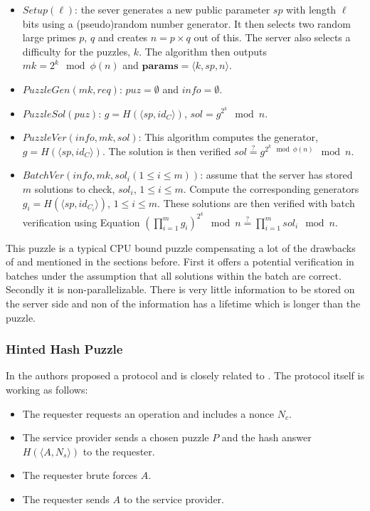 \begin{itemize}
	\item $Setup(\ell)$: the sever generates a new public parameter $sp$ with length $\ell$ bits using a (pseudo)random number generator. It then selects two random large primes $p$, $q$ and creates $n = p \times q$ out of this. The server also selects a difficulty for the puzzles, $k$. The algorithm then outputs $mk = 2^k  \mod \phi(n)$ and $\mathbf{params} = \langle k, sp, n \rangle$.
	\item $PuzzleGen(mk, req)$: $puz = \emptyset$ and $info = \emptyset$.	
	\item $PuzzleSol(puz)$: $g = H( \langle sp, id_C \rangle )$, $sol = g^{2^k} \mod n$.
	\item $PuzzleVer(info, mk, sol)$: This algorithm computes the generator, $g = H( \langle sp, id_C \rangle )$. The solution is then verified $sol \stackrel{?}{=} g^{2^k \mod \phi(n)} \mod n$.
	\item $BatchVer(info, mk, sol_i (1 \leq i \leq m))$: assume that the server has stored $m$ solutions to check, $sol_i$, 
	$1 \leq i \leq m$. Compute the corresponding generators $g_i = H( \langle sp, id_{C_i}\rangle )$, $1 \leq i \leq m$.  These solutions are then verified with batch verification using Equation $(\prod_{i=1}^{m}g_i)^{2^k} \mod n \stackrel{?}{=} \prod_{i=1}^{m} sol_i \mod n$.
\end{itemize}

This puzzle is a typical CPU bound puzzle compensating a lot of the drawbacks of \cite{aura2000resistant} and \cite{juels1999client} mentioned in the sections before. First it offers a potential verification in batches under the assumption that all solutions within the batch are correct. Secondly it is non-parallelizable. There is very little information to be stored on the server side and non of the information has a lifetime which is longer than the puzzle.


\subsubsection{Hinted Hash Puzzle} 
In \cite{1498523} the authors \citeauthor{1498523} proposed a protocol and is closely related to \cite{aura2000resistant}. The protocol itself is working as follows:

\begin{itemize}
	\item The requester requests an operation and includes a nonce $N_c$.
	\item The service provider sends a chosen puzzle $P$ and the hash answer $H(\langle A,N_s\rangle )$ to the requester.
	\item The requester brute forces $A$.
	\item The requester sends $A$ to the service provider.
\end{itemize}

